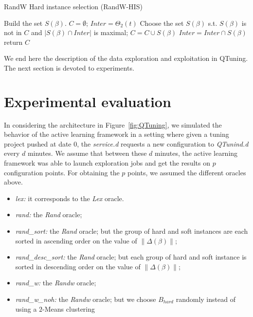 \documentclass[10pt, conference, compsocconf]{IEEEtran}
\newcommand{\norm}[1]{\left\lVert#1\right\rVert}
\begin{document}
	\begin{algorithm}                    
	\caption{\scriptsize RandW Hard instance selection (RandW-HIS)} 	\label{alg4}  
	\begin{algorithmic}[1]
	\scriptsize
	\STATE Build the set $S(\beta)$.
	\ENDFOR
	\STATE $C = \emptyset$; $Inter = \Theta_2(t)$
		\STATE Choose the set $S(\beta)$ s.t. $S(\beta)$ is not in $C$ and $|S(\beta) \cap Inter|$ is maximal;
		\STATE $C  = C \cup S(\beta)$
                \STATE $Inter = Inter \cap S(\beta)$
	\ENDWHILE
	\STATE return $C$
	\end{algorithmic}
	\end{algorithm}
	\normalsize

We end here the description of the data exploration and exploitation in QTuning. The next section is devoted to experiments.


\section{Experimental evaluation} \label{Proof-of-concept}

In considering the architecture in Figure~\ref{fig:QTuning}, we simulated the behavior of 
the active learning framework in a setting where given a tuning project pushed at date $0$, the 
{\it service.d} requests a new configuration to {\it QTunind.d} every $d$ minutes. 
We assume that between these $d$ minutes, the active learning framework was able to launch exploration 
jobs and get the results on $p$ configuration points. For obtaining the $p$ points, we assumed the different 
oracles above.
\begin{itemize}
\item {\it lex:} it corresponds to the {\it Lex} oracle.
\item {\it rand:} the {\it Rand} oracle;
\item {\it rand\_sort:} the {\it Rand} oracle; but the group of hard and soft instances are each sorted in ascending order on the value of $\norm{\Delta(\beta)}$;
\item {\it rand\_desc\_sort:} the {\it Rand} oracle; but each group of hard and soft instance is sorted in descending order on the value of $\norm{\Delta(\beta)}$;
\item {\it rand\_w:} the {\it Randw} oracle;
\item {\it rand\_w\_noh:} the {\it Randw} oracle; but we choose $B_{hard}$ randomly instead of using a $2$-Means clustering
\end{itemize}
\end{document}
